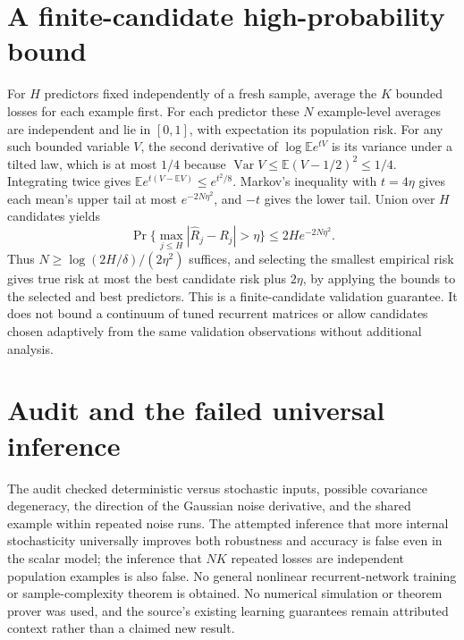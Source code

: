 \documentclass[11pt]{article}
\begin{document}
\section{A finite-candidate high-probability bound}
For $H$ predictors fixed independently of a fresh sample, average
the $K$ bounded losses for each example first. For each predictor
these $N$ example-level averages are independent and lie in
$[0,1]$, with expectation its population risk. For any such
bounded variable $V$, the second derivative of
$\log\mathbb E e^{tV}$ is its variance under a tilted law,
which is at most $1/4$ because
$\operatorname{Var}V\le\mathbb E(V-1/2)^2\le1/4$.
Integrating twice gives
$\mathbb E e^{t(V-\mathbb EV)}\le e^{t^2/8}$.
Markov's inequality with $t=4\eta$ gives each mean's upper
tail at most $e^{-2N\eta^2}$, and $-t$ gives the lower tail.
Union over $H$ candidates yields
\[
 \Pr\{\max_{j\le H}|\widehat R_j-R_j|>\eta\}
 \le2H e^{-2N\eta^2}.
\]
Thus $N\ge\log(2H/\delta)/(2\eta^2)$ suffices, and
selecting the smallest empirical risk gives true risk at most
the best candidate risk plus $2\eta$, by applying the bounds
to the selected and best predictors. This is a finite-candidate
validation guarantee. It does not bound a continuum of tuned
recurrent matrices or allow candidates chosen adaptively from
the same validation observations without additional analysis.

\section{Audit and the failed universal inference}
The audit checked deterministic versus stochastic inputs,
possible covariance degeneracy, the direction of the Gaussian
noise derivative, and the shared example within repeated noise
runs. The attempted inference that more internal stochasticity
universally improves both robustness and accuracy is false even
in the scalar model; the inference that $NK$ repeated losses
are independent population examples is also false. No general
nonlinear recurrent-network training or sample-complexity theorem
is obtained. No numerical simulation or theorem prover was used,
and the source's existing learning guarantees remain attributed
context rather than a claimed new result.
\end{document}
